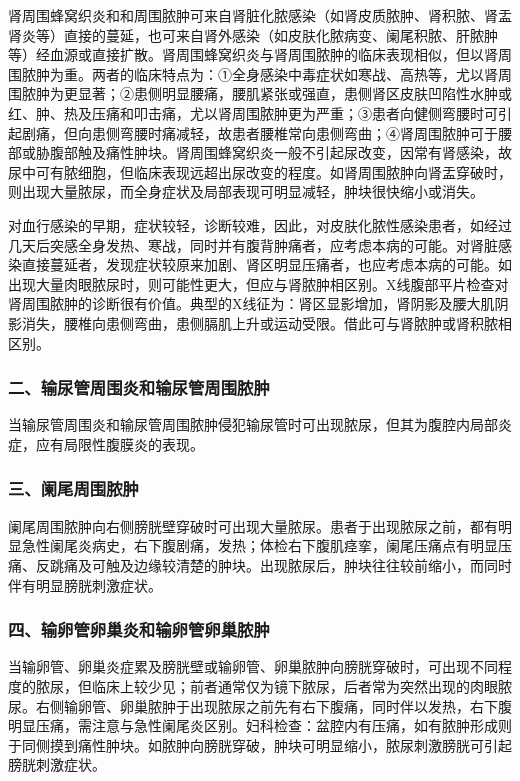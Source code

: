 肾周围蜂窝织炎和和周围脓肿可来自肾脏化脓感染（如肾皮质脓肿、肾积脓、肾盂肾炎等）直接的蔓延，也可来自肾外感染（如皮肤化脓病变、阑尾积脓、肝脓肿等）经血源或直接扩散。肾周围蜂窝织炎与肾周围脓肿的临床表现相似，但以肾周围脓肿为重。两者的临床特点为：①全身感染中毒症状如寒战、高热等，尤以肾周围脓肿为更显著；②患侧明显腰痛，腰肌紧张或强直，患侧肾区皮肤凹陷性水肿或红、肿、热及压痛和叩击痛，尤以肾周围脓肿更为严重；③患者向健侧弯腰时可引起剧痛，但向患侧弯腰时痛减轻，故患者腰椎常向患侧弯曲；④肾周围脓肿可于腰部或胁腹部触及痛性肿块。肾周围蜂窝织炎一般不引起尿改变，因常有肾感染，故尿中可有脓细胞，但临床表现远超出尿改变的程度。如肾周围脓肿向肾盂穿破时，则出现大量脓尿，而全身症状及局部表现可明显减轻，肿块很快缩小或消失。

对血行感染的早期，症状较轻，诊断较难，因此，对皮肤化脓性感染患者，如经过几天后突感全身发热、寒战，同时并有腹背肿痛者，应考虑本病的可能。对肾脏感染直接蔓延者，发现症状较原来加剧、肾区明显压痛者，也应考虑本病的可能。如出现大量肉眼脓尿时，则可能性更大，但应与肾脓肿相区别。X线腹部平片检查对肾周围脓肿的诊断很有价值。典型的X线征为：肾区显影增加，肾阴影及腰大肌阴影消失，腰椎向患侧弯曲，患侧膈肌上升或运动受限。借此可与肾脓肿或肾积脓相区别。

\subsubsection{二、输尿管周围炎和输尿管周围脓肿}

当输尿管周围炎和输尿管周围脓肿侵犯输尿管时可出现脓尿，但其为腹腔内局部炎症，应有局限性腹膜炎的表现。

\subsubsection{三、阑尾周围脓肿}

阑尾周围脓肿向右侧膀胱壁穿破时可出现大量脓尿。患者于出现脓尿之前，都有明显急性阑尾炎病史，右下腹剧痛，发热；体检右下腹肌痉挛，阑尾压痛点有明显压痛、反跳痛及可触及边缘较清楚的肿块。出现脓尿后，肿块往往较前缩小，而同时伴有明显膀胱刺激症状。

\subsubsection{四、输卵管卵巢炎和输卵管卵巢脓肿}

当输卵管、卵巢炎症累及膀胱壁或输卵管、卵巢脓肿向膀胱穿破时，可出现不同程度的脓尿，但临床上较少见；前者通常仅为镜下脓尿，后者常为突然出现的肉眼脓尿。右侧输卵管、卵巢脓肿于出现脓尿之前先有右下腹痛，同时伴以发热，右下腹明显压痛，需注意与急性阑尾炎区别。妇科检查：盆腔内有压痛，如有脓肿形成则于同侧摸到痛性肿块。如脓肿向膀胱穿破，肿块可明显缩小，脓尿刺激膀胱可引起膀胱刺激症状。


